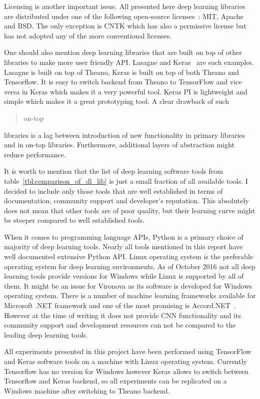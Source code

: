 \documentclass[a4paper, 11pt, table]{article}
\begin{document}
Licensing is another important issue. All presented here deep learning libraries are distributed under one of the following open-source licenses~\cite{Rosen:2004:OSL:1014911}: MIT, Apache and BSD. The only exception is CNTK which has also a permissive license but has not adopted any of the more conventional licenses.

One should also mention deep learning libraries that are built on top of other libraries to make more user friendly API. Lasagne and Keras~\cite{chollet2015keras} are such examples. Lasagne is built on top of Theano, Keras is built on top of both Theano and Tensorflow. It is easy to switch backend from Theano to TensorFlow and vice versa in Keras which makes it a very powerful tool. Keras PI is lightweight and simple which makes it a great prototyping tool. A clear drawback of such \blockquote{on-top} libraries is a lag between introduction of new functionality in primary libraries and in on-top libraries. Furthermore, additional layers of abstraction might reduce performance. 

It is worth to mention that the list of deep learning software tools from  table~\ref{tbl:comparison_of_dl_lib} is just a small fraction of all available tools. I decided to include only those tools that are well established in terms of documentation, community support and developer's reputation. This absolutely does not mean that other tools are of poor quality, but their learning curve might be steeper compared to well established tools.

When it comes to programming language APIs, Python is a primary choice of majority of deep learning tools. Nearly all tools mentioned in this report have well documented extensive Python API. Linux operating system is the preferable operating system for deep learning environments. As of October 2016 not all deep learning tools provide versions for Windows while Linux is supported by all of them. It might be an issue for Vironova as its software is developed for Windows operating system. There is a number of machine learning frameworks available for Microsoft .NET framework and one of the most promising is Accord.NET~\cite{accordnet}. However at the time of writing it does not provide CNN functionality and its community support and development resources can not be compared to the leading deep learning tools. 

All experiments presented in this project have been performed using TensorFlow and Keras software tools on a machine with Linux operating system. Currently Tensorflow has no version for Windows however Keras allows to switch between Tensorflow and Keras backend, so all experiments can be replicated on a Windows machine after switching to Theano backend.
\end{document}
